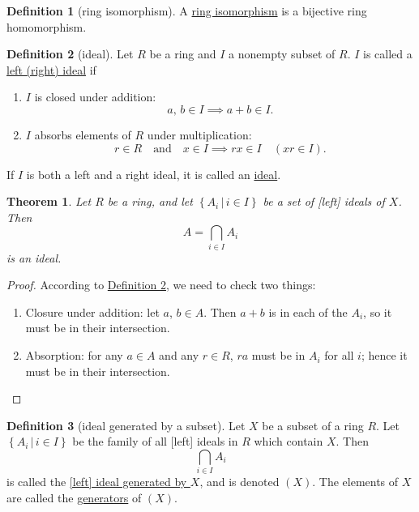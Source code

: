 \documentclass[a4paper,10pt]{scrreprt}
\newcommand{\defn}[1]{\ul{#1}}
\theoremstyle{definition}
\newtheorem{definition}{Definition}[section]
\theoremstyle{plain}
\newtheorem{theorem}{Theorem}[section]
\theoremstyle{remark}
\begin{document}
\begin{definition}[ring isomorphism]
  \label{def:ringisomorphism} 
  A \defn{ring isomorphism} is a bijective ring homomorphism.
\end{definition}

\begin{definition}[ideal]
  \label{def:ideal}
  Let $R$ be a ring and $I$ a nonempty subset of $R$. $I$ is called a \defn{left (right) ideal} if
  \begin{enumerate}
    \item $I$ is closed under addition:
      \begin{equation*}
        a,\,b \in I \implies a+b\in I.
      \end{equation*}

    \item $I$ absorbs elements of $R$ under multiplication:
      \begin{equation*}
        r \in R \quad\text{and}\quad x\in I \implies rx \in I\quad (xr \in I).
      \end{equation*}
  \end{enumerate}
  If $I$ is both a left and a right ideal, it is called an \defn{ideal}.
\end{definition}
\begin{theorem}
  Let $R$ be a ring, and let $\left\{ A_{i}\,\big|\, i \in I \right\}$ be a set of [left] ideals of $X$. Then 
  \begin{equation*}
    A = \bigcap_{i \in I}A_{i}
  \end{equation*}
  is an ideal.
  \label{thm:intersectionofidealsisideal}
\end{theorem}
\begin{proof}
  According to \hyperref[def:ideal]{Definition \ref*{def:ideal}}, we need to check two things:
  \begin{enumerate}
    \item Closure under addition: let $a$, $b\in A$. Then $a+b$ is in each of the $A_{i}$, so it must be in their intersection.
    \item Absorption: for any $a \in A$ and any $r \in R$, $ra$ must be in $A_{i}$ for all $i$; hence it must be in their intersection.
  \end{enumerate}
\end{proof}

\begin{definition}[ideal generated by a subset]
  \label{def:idealgenerated}
  Let $X$ be a subset of a ring $R$. Let $\left\{ A_{i}\,\big|\, i \in I \right\}$ be the family of all [left] ideals in $R$ which contain $X$. Then 
  \begin{equation*}
    \bigcap_{i \in I} A_{i}
  \end{equation*}
  is called the \defn{[left] ideal generated by $X$}, and is denoted $(X)$. The elements of $X$ are called the \defn{generators} of $(X)$.
\end{definition}
\end{document}
